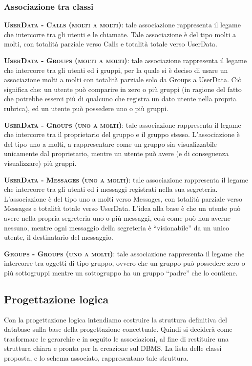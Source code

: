\subsubsection{Associazione tra classi}

\begin{description}
	\item{\scshape\bfseries UserData - Calls (molti a molti)}: tale associazione rappresenta il legame che intercorre tra gli utenti e le chiamate. Tale associazione è del tipo molti a molti, con totalità parziale verso Calls e totalità totale verso UserData.
	\item{\scshape\bfseries UserData - Groups (molti a molti)}: tale associazione rappresenta il legame che intercorre tra gli utenti ed i gruppi, per la quale si è deciso di usare un associazione molti a molti con totalità parziale solo da Groups a UserData. Ciò significa che: un utente può comparire in zero o più gruppi (in ragione del fatto che potrebbe esserci più di qualcuno che registra un dato utente nella propria rubrica), ed un utente può possedere uno o più gruppi.
	\item{\scshape\bfseries UserData - Groups (uno a molti)}: tale associazione rappresenta il legame che intercorre tra il proprietario del gruppo e il gruppo stesso. L'associazione è del tipo uno a molti, a rappresentare come un gruppo sia visualizzabile unicamente dal proprietario, mentre un utente può avere (e di conseguenza visualizzare) più gruppi.
	\item{\scshape\bfseries UserData - Messages (uno a molti)}: tale associazione rappresenta il legame che intercorre tra gli utenti ed i messaggi registrati nella sua segreteria. L'associazione è del tipo uno a molti verso Messages, con totalità parziale verso Messages e totalità totale verso UserData. L'idea alla base è che un utente può avere nella propria segreteria uno o più messaggi, così come può non averne nessuno, mentre ogni messaggio della segreteria è ``visionabile'' da un unico utente, il destinatario del messaggio.
	\item{\scshape\bfseries Groups - Groups (uno a molti)}: tale associazione rappresenta il legame che intercorre tra oggetti di tipo gruppo, ovvero che un gruppo può possedere zero o più sottogruppi mentre un sottogruppo ha un gruppo ``padre'' che lo contiene.
\end{description}

\subsection{Progettazione logica}
Con la progettazione logica intendiamo costruire la struttura definitiva del database sulla base della progettazione concettuale. Quindi si deciderà come trasformare le gerarchie e in seguito le associazioni, al fine di restituire una struttura chiara e pronta per la creazione sul DBMS\@. La lista delle classi proposta, e lo schema associato, rappresentano tale struttura.

